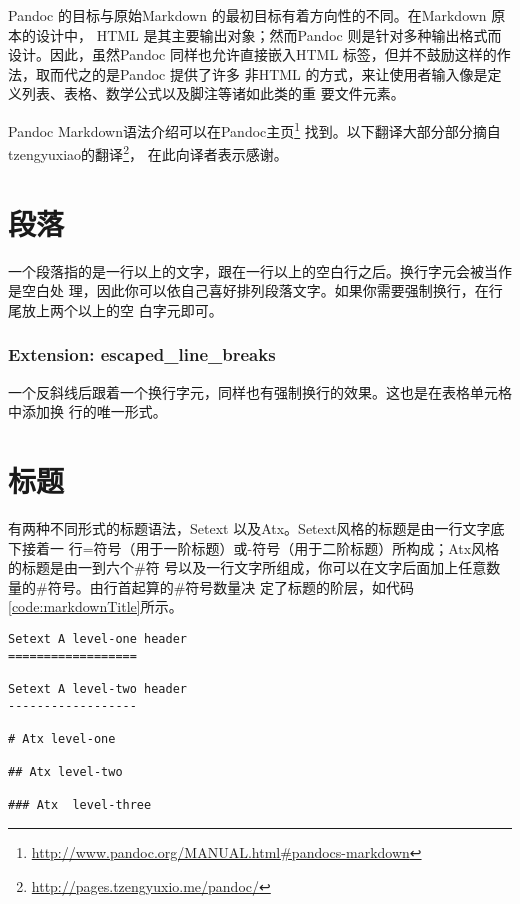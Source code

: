 \documentclass[fancyhdr,bookmark]{ctexbook}
\renewcommand{\href}[2]{#2\footnote{\url{#1}}}
\begin{document}
Pandoc 的目标与原始Markdown 的最初目标有着方向性的不同。在Markdown
原本的设计中， HTML 是其主要输出对象；然而Pandoc
则是针对多种输出格式而设计。因此，虽然Pandoc 同样也允许直接嵌入HTML
标签，但并不鼓励这样的作法，取而代之的是Pandoc 提供了许多 非HTML
的方式，来让使用者输入像是定义列表、表格、数学公式以及脚注等诸如此类的重
要文件元素。

Pandoc
Markdown语法介绍可以在\href{http://www.pandoc.org/MANUAL.html\#pandocs-markdown}{Pandoc主页}
找到。以下翻译大部分部分摘自\href{http://pages.tzengyuxio.me/pandoc/}{tzengyuxiao的翻译}，
在此向译者表示感谢。

\hypertarget{ux6bb5ux843d}{%
\section{段落}\label{ux6bb5ux843d}}

一个段落指的是一行以上的文字，跟在一行以上的空白行之后。换行字元会被当作是空白处
理，因此你可以依自己喜好排列段落文字。如果你需要强制换行，在行尾放上两个以上的空
白字元即可。

\hypertarget{extension-escaped_line_breaks}{%
\subsubsection{Extension:
escaped\_line\_breaks}\label{extension-escaped_line_breaks}}

一个反斜线后跟着一个换行字元，同样也有强制换行的效果。这也是在表格单元格中添加换
行的唯一形式。

\hypertarget{ux6807ux9898}{%
\section{标题}\label{ux6807ux9898}}

有两种不同形式的标题语法，Setext
以及Atx。Setext风格的标题是由一行文字底下接着一
行=符号（用于一阶标题）或-符号（用于二阶标题）所构成；Atx风格的标题是由一到六个\#符
号以及一行文字所组成，你可以在文字后面加上任意数量的\#符号。由行首起算的\#符号数量决
定了标题的阶层，如代码\ref{code:markdownTitle}所示。

\begin{lstlisting}[caption=测试, label=code:markdownTitle, float=htbp]
Setext A level-one header
==================

Setext A level-two header
------------------

# Atx level-one

## Atx level-two

### Atx  level-three
\end{lstlisting}
\end{document}
